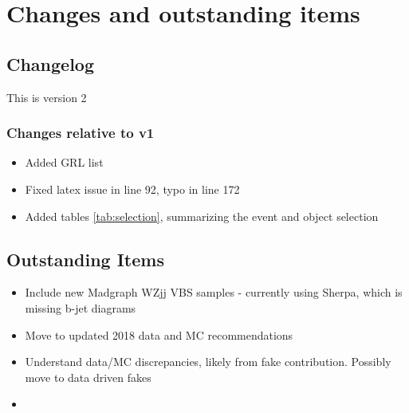\documentclass[NOTE, atlasdraft=true, texlive=2016, UKenglish]{\ATLASLATEXPATH atlasdoc}
\begin{document}
\maketitle

\tableofcontents

\clearpage

\section{Changes and outstanding items}
\label{sec:changes}

\subsection{Changelog}

This is version 2

\subsubsection{Changes relative to v1}

\begin{itemize}
    \item Added GRL list
    \item Fixed latex issue in line 92, typo in line 172
    \item Added tables \ref{tab:selection}, summarizing the event and object selection
\end{itemize}

\subsection{Outstanding Items}

\begin{itemize}
    \item Include new Madgraph WZjj VBS samples - currently using Sherpa, which is missing b-jet diagrams
    \item Move to updated 2018 data and MC recommendations
    \item Understand data/MC discrepancies, likely from fake contribution. Possibly move to data driven fakes
    \item 
\end{itemize}
\end{document}

